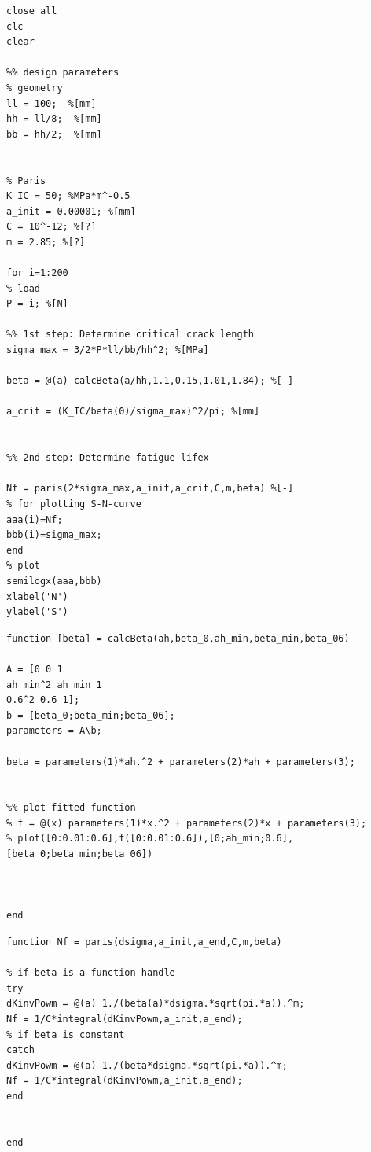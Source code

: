 \documentclass{article}
\begin{document}
\newpage
\begin{appendices}
\begin{lstlisting}[caption=main.m]
%%
close all
clc
clear

%% design parameters
% geometry
ll = 100;  %[mm]
hh = ll/8;  %[mm]
bb = hh/2;  %[mm]


% Paris
K_IC = 50; %MPa*m^-0.5
a_init = 0.00001; %[mm]
C = 10^-12; %[?]
m = 2.85; %[?]

for i=1:200
% load
P = i; %[N]

%% 1st step: Determine critical crack length
sigma_max = 3/2*P*ll/bb/hh^2; %[MPa]

beta = @(a) calcBeta(a/hh,1.1,0.15,1.01,1.84); %[-]

a_crit = (K_IC/beta(0)/sigma_max)^2/pi; %[mm]


%% 2nd step: Determine fatigue lifex

Nf = paris(2*sigma_max,a_init,a_crit,C,m,beta) %[-]
% for plotting S-N-curve
aaa(i)=Nf;
bbb(i)=sigma_max;
end
% plot
semilogx(aaa,bbb)
xlabel('N')
ylabel('S')
\end{lstlisting}
\begin{lstlisting}[caption=calcBeta.m]
function [beta] = calcBeta(ah,beta_0,ah_min,beta_min,beta_06)

A = [0 0 1
ah_min^2 ah_min 1
0.6^2 0.6 1];
b = [beta_0;beta_min;beta_06];
parameters = A\b;

beta = parameters(1)*ah.^2 + parameters(2)*ah + parameters(3);


%% plot fitted function
% f = @(x) parameters(1)*x.^2 + parameters(2)*x + parameters(3);
% plot([0:0.01:0.6],f([0:0.01:0.6]),[0;ah_min;0.6],[beta_0;beta_min;beta_06])



end
\end{lstlisting}
\begin{lstlisting}[caption=paris.m]
function Nf = paris(dsigma,a_init,a_end,C,m,beta)

% if beta is a function handle
try
dKinvPowm = @(a) 1./(beta(a)*dsigma.*sqrt(pi.*a)).^m;
Nf = 1/C*integral(dKinvPowm,a_init,a_end);
% if beta is constant
catch
dKinvPowm = @(a) 1./(beta*dsigma.*sqrt(pi.*a)).^m;
Nf = 1/C*integral(dKinvPowm,a_init,a_end);
end


end
\end{lstlisting}
\end{appendices}
\end{document}
